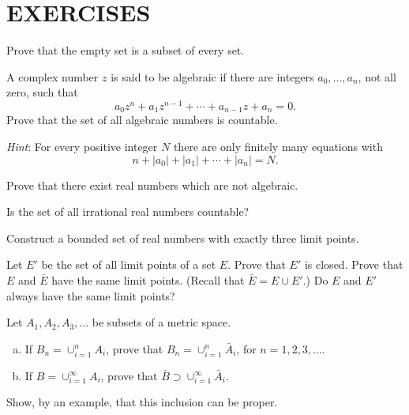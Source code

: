 
\section*{EXERCISES}

\begin{myExercise}
    \label{ex:2.1}
    Prove that the empty set is a subset of every set.
\end{myExercise}

\begin{myExercise}
    \label{ex:2.2}
    A complex number $z$ is said to be algebraic 
    if there are integers $a_0, ... , a_n$, not all
    zero, such that
    \begin{equation*}
        a_{0} z^{n} 
        + a_{1} z^{n-1}
        +\cdots
        + a_{n-1} z
        + a_n = 0 .
    \end{equation*}
    Prove that the set of all algebraic numbers is countable. 
    
    \emph{Hint}: For every positive integer $N$ 
    there are only finitely many equations with
    \begin{equation*}
        n 
        + |a_0|
        + |a_1|
        + \cdots
        + |a_n| = N .
    \end{equation*}
\end{myExercise}

\begin{myExercise}
    \label{ex:2.3}
    Prove that there exist real numbers which are not algebraic.
\end{myExercise}

\begin{myExercise}
    \label{ex:2.4}
    Is the set of all irrational real numbers countable?
\end{myExercise}

\begin{myExercise}
    \label{ex:2.5}
    Construct a bounded set of real numbers with exactly three limit points.
\end{myExercise}

\begin{myExercise}
    \label{ex:2.6}
    Let $E'$ be the set of all limit points of a set $E$. 
    Prove that $E'$ is closed. 
    Prove that $E$ and $\bar{E}$ have the same limit points. 
    (Recall that $\bar{E} = E \cup E'$.) 
    Do $E$ and $E'$ always have the same limit points?
\end{myExercise}

\begin{myExercise}
    \label{ex:2.7}
    Let $A_1, A_2, A_3, ...$ be subsets of a metric space.
    \begin{enumerate}[(a)]
        \item If $B_n = \cup_{i=1}^n A_i$, 
        prove that $B_n = \cup_{i=1}^n \bar{A}_i$, 
        for $n = 1, 2, 3, ...$.
        \item If $B = \cup_{i=1}^{\infty} A_i$, 
        prove that $\bar{B} \supset \cup_{i=1}^{\infty}\bar{A}_i$.
    \end{enumerate}
    Show, by an example, that this inclusion can be proper.
\end{myExercise}

